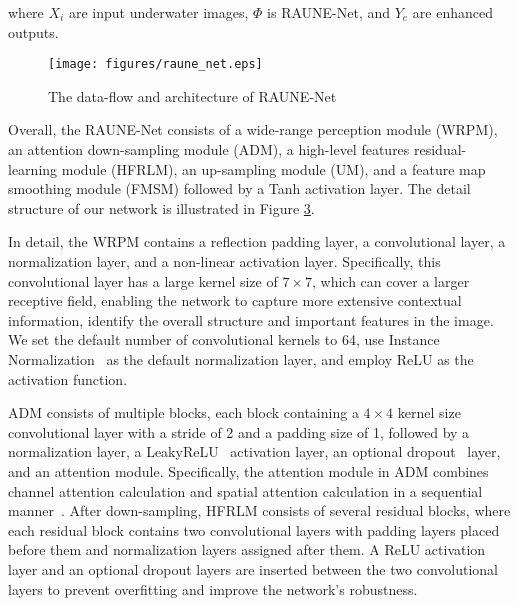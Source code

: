\documentclass[runningheads]{llncs}
\begin{document}
\noindent where $X_i$ are input underwater images, $\Phi$ is RAUNE-Net, and $Y_e$ are enhanced outputs.

\begin{figure}
    \centering
    \texttt{[image: figures/raune\_net.eps]}
    \caption{The data-flow and architecture of RAUNE-Net}
    \label{raune-net}
\end{figure}

Overall, the RAUNE-Net consists of a wide-range perception module (WRPM), an attention down-sampling module (ADM), a high-level features residual-learning module (HFRLM), an up-sampling module (UM), and a feature map smoothing module (FMSM) followed by a Tanh activation layer. The detail structure of our network is illustrated in Figure \hyperref[raune-net-details]{3}.

In detail, the WRPM contains a reflection padding layer, a convolutional layer, a normalization layer, and a non-linear activation layer. Specifically, this convolutional layer has a large kernel size of $7\times7$, which can cover a larger receptive field, enabling the network to capture more extensive contextual information, identify the overall structure and important features in the image. We set the default number of convolutional kernels to 64, use Instance Normalization~\cite{ulyanov2016instance} as the default normalization layer, and employ ReLU as the activation function.

ADM consists of multiple blocks, each block containing a $4\times4$ kernel size convolutional layer with a stride of 2 and a padding size of 1, followed by a normalization layer, a LeakyReLU~\cite{maas2013rectifier} activation layer, an optional dropout~\cite{srivastava2014dropout} layer, and an attention module. Specifically, the attention module in ADM combines channel attention calculation and spatial attention calculation in a sequential manner~\cite{woo2018cbam}. After down-sampling, HFRLM consists of several residual blocks, where each residual block contains two convolutional layers with padding layers placed before them and normalization layers assigned after them. A ReLU activation layer and an optional dropout layers are inserted between the two convolutional layers to prevent overfitting and improve the network's robustness.
\end{document}
